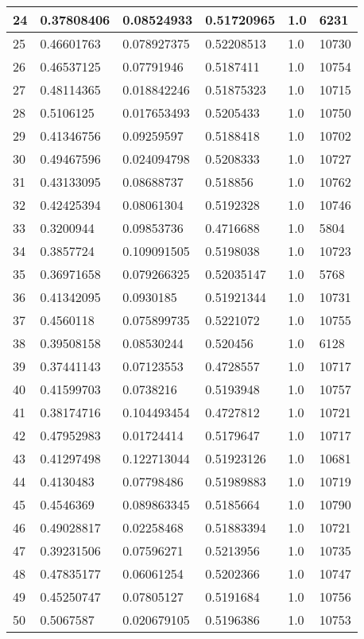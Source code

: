 \begin{longtable}{|l|l|l|l|l|l|}
24 & 0.37808406 & 0.08524933 & 0.51720965 & 1.0 & 6231 \\ \hline 
25 & 0.46601763 & 0.078927375 & 0.52208513 & 1.0 & 10730 \\ \hline 
26 & 0.46537125 & 0.07791946 & 0.5187411 & 1.0 & 10754 \\ \hline 
27 & 0.48114365 & 0.018842246 & 0.51875323 & 1.0 & 10715 \\ \hline 
28 & 0.5106125 & 0.017653493 & 0.5205433 & 1.0 & 10750 \\ \hline 
29 & 0.41346756 & 0.09259597 & 0.5188418 & 1.0 & 10702 \\ \hline 
30 & 0.49467596 & 0.024094798 & 0.5208333 & 1.0 & 10727 \\ \hline 
31 & 0.43133095 & 0.08688737 & 0.518856 & 1.0 & 10762 \\ \hline 
32 & 0.42425394 & 0.08061304 & 0.5192328 & 1.0 & 10746 \\ \hline 
33 & 0.3200944 & 0.09853736 & 0.4716688 & 1.0 & 5804 \\ \hline 
34 & 0.3857724 & 0.109091505 & 0.5198038 & 1.0 & 10723 \\ \hline 
35 & 0.36971658 & 0.079266325 & 0.52035147 & 1.0 & 5768 \\ \hline 
36 & 0.41342095 & 0.0930185 & 0.51921344 & 1.0 & 10731 \\ \hline 
37 & 0.4560118 & 0.075899735 & 0.5221072 & 1.0 & 10755 \\ \hline 
38 & 0.39508158 & 0.08530244 & 0.520456 & 1.0 & 6128 \\ \hline 
39 & 0.37441143 & 0.07123553 & 0.4728557 & 1.0 & 10717 \\ \hline 
40 & 0.41599703 & 0.0738216 & 0.5193948 & 1.0 & 10757 \\ \hline 
41 & 0.38174716 & 0.104493454 & 0.4727812 & 1.0 & 10721 \\ \hline 
42 & 0.47952983 & 0.01724414 & 0.5179647 & 1.0 & 10717 \\ \hline 
43 & 0.41297498 & 0.122713044 & 0.51923126 & 1.0 & 10681 \\ \hline 
44 & 0.4130483 & 0.07798486 & 0.51989883 & 1.0 & 10719 \\ \hline 
45 & 0.4546369 & 0.089863345 & 0.5185664 & 1.0 & 10790 \\ \hline 
46 & 0.49028817 & 0.02258468 & 0.51883394 & 1.0 & 10721 \\ \hline 
47 & 0.39231506 & 0.07596271 & 0.5213956 & 1.0 & 10735 \\ \hline 
48 & 0.47835177 & 0.06061254 & 0.5202366 & 1.0 & 10747 \\ \hline 
49 & 0.45250747 & 0.07805127 & 0.5191684 & 1.0 & 10756 \\ \hline 
50 & 0.5067587 & 0.020679105 & 0.5196386 & 1.0 & 10753 \\ \hline 
\end{longtable}